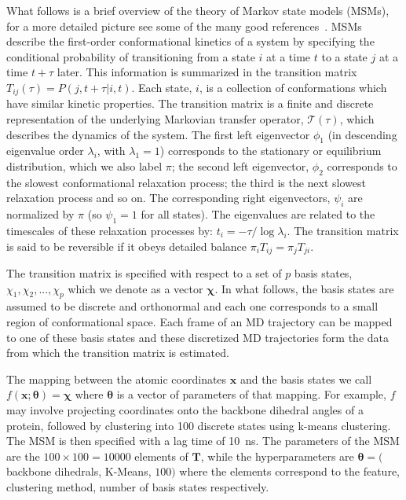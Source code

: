 \documentclass[journal=jacsat,manuscript=article]{achemso}
\begin{document}
What follows is a brief overview of the theory of Markov state models (MSMs), for a more detailed picture see some of the many good references~\cite{prinzMarkovModelsMolecular2011, trendelkamp-schroer_estimation_2015,husic_markov_2018}. MSMs describe the first-order conformational kinetics of a system by specifying the conditional probability of transitioning from a state $i$ at a time $t$ to a state $j$ at a time $t+\tau$  later. This information is summarized in the transition matrix $T_{ij}(\tau) = P(j, t+\tau | i, t)$. Each state, $i$, is a collection of conformations which have similar kinetic properties. The transition matrix is a finite and discrete representation of the underlying Markovian transfer operator, $\mathcal{T}(\tau)$, which describes the dynamics of the system. The first left eigenvector $\phi_1$ (in descending eigenvalue order $\lambda_i$, with $\lambda_{1} = 1$) corresponds to the stationary or equilibrium distribution, which we also label $\pi$; the second left eigenvector, $\phi_2$ corresponds to the slowest conformational relaxation process; the third is the next slowest relaxation process and so on. The corresponding right eigenvectors, $\psi_{i}$ are normalized by $\pi$ (so $\psi_{1} = 1$ for all states). The eigenvalues are related to the timescales of these relaxation processes by: $t_{i} = -\tau/\log{\lambda_i}$.  The transition matrix is said to be reversible if it obeys detailed balance $\pi_i T_{ij}=\pi_j T_{ji}$. 

The transition matrix is specified with respect to a set of $p$ basis states, $\chi_1, \chi_2, ..., \chi_p$ which we denote as a vector $\bm{\chi}$. In what follows, the basis states are assumed to be discrete and orthonormal and each one corresponds to a small region of conformational space.  Each frame of an MD trajectory can be mapped to one of these basis states and these discretized MD trajectories form the data from which the transition matrix is estimated.

The mapping between the atomic coordinates $\mathbf{x}$ and the basis states we call $f(\mathbf{x}; \bm{\theta}) =  \bm{\chi}$ where $\bm{\theta}$ is a vector of parameters of that mapping. For example, $f$ may involve projecting coordinates onto the backbone dihedral angles of a protein, followed by clustering into \num{100} discrete states using k-means clustering. The MSM is then specified with a lag time of \SI{10}{\nano\second}. The parameters of the MSM are the $100 \times 100 = 10000$ elements of $\mathbf{T}$, while the hyperparameters are $\bm{\theta}=($backbone dihedrals, K-Means, $100)$ where the elements correspond to the feature, clustering method, number of basis states respectively.  
\end{document}
